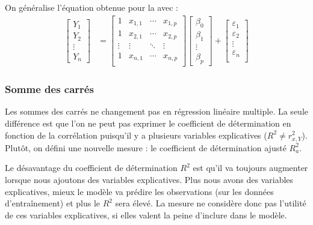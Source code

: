 \documentclass[french]{article}
\begin{document}
\begin{multicols*}{2}
On généralise l'équation obtenue pour la \textit{\underline{}}  avec : 
\begin{align*}
	\begin{bmatrix}
		Y_{1}	\\
		Y_{2}	\\
		\vdots	\\
		Y_{n}
	\end{bmatrix}
	&=	
	\begin{bmatrix}
		1	&	x_{1, 1}	&	\cdots	&	x_{1, p}	\\
		1	&	x_{2, 1}	&	\cdots	&	x_{2, p}	\\
	\vdots	&	\vdots	&	\ddots	&	\vdots	\\
		1	&	x_{n, 1}	&	\cdots	&	x_{n, p}	\\
	\end{bmatrix}
	\begin{bmatrix}
		\beta_{0}	\\
		\beta_{1}	\\
		\vdots		\\
		\beta_{p}
	\end{bmatrix} + 
	\begin{bmatrix}
		\varepsilon_{1}	\\
		\varepsilon_{2}	\\
		\vdots	\\
		\varepsilon_{n}	\\
	\end{bmatrix}
\end{align*}



\columnbreak
\subsubsection{Somme des carrés}
\begin{rappel_enhanced}[Contexte]
Les sommes des carrés ne changement pas en régression linéaire multiple. La seule différence est que l'on ne peut pas exprimer le coefficient de détermination en fonction de la corrélation puisqu'il y a plusieurs variables explicatives ($R^{2} \neq r_{x, Y}^{2}$). Plutôt, on défini une nouvelle mesure : le coefficient de détermination ajusté $R_{a}^{2}$.
\end{rappel_enhanced}


\begin{definitionNOHFILL}
\begin{rappel_enhanced}[Contexte]
Le désavantage du coefficient de détermination $R^{2}$ est qu'il va toujours augmenter lorsque nous ajoutons des variables explicatives. Plus nous avons des variables explicatives, mieux le modèle va prédire les observations (sur les données d'entraînement) et plus le $R^{2}$ sera élevé. La mesure ne considère donc pas l'utilité de ces variables explicatives, si elles valent la peine d'inclure dans le modèle.


\end{rappel_enhanced}
\end{definitionNOHFILL}
\end{multicols*}
\end{document}
